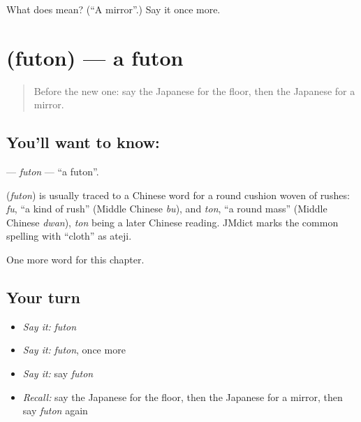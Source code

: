 \begin{tcolorbox}[breakable,colback=teal!4,colframe=teal!35!black,title={Before you move on}]
What does  mean? (\textquotedblleft{}A mirror\textquotedblright{}.) Say it once more.
\end{tcolorbox}
\section[\texorpdfstring{\ja{ふとん} (futon)}{ふとん (futon)}]{ (futon) — a futon}

\label{lesson:JA-C38-futon}



\begin{quote}
Before the new one: say the Japanese for the floor, then the Japanese for a mirror.
\end{quote}

\subsection*{You'll want to know: }
\textbf{} — \emph{futon} — \textquotedblleft{}a futon\textquotedblright{}.

\begin{cousinweb}
\textbf{} (\emph{futon}) is usually traced to a Chinese word for a round cushion woven of rushes: \emph{fu}, \textquotedblleft{}a kind of rush\textquotedblright{} (Middle Chinese \emph{bu}), and \emph{ton}, \textquotedblleft{}a round mass\textquotedblright{} (Middle Chinese \emph{dwan}), \emph{ton} being a later Chinese reading. JMdict marks the common spelling with \textquotedblleft{}cloth\textquotedblright{} as ateji.
\end{cousinweb}

\begin{grammarlens}[title={What you've built}]
One more word for this chapter.
\end{grammarlens}

\subsection*{Your turn}
\begin{itemize}
\raggedright
  \item \emph{Say it:} \emph{futon}
  \item \emph{Say it:} \emph{futon}, once more
  \item \emph{Say it:} say \emph{futon}
  \item \emph{Recall:} say the Japanese for the floor, then the Japanese for a mirror, then say \emph{futon} again
\end{itemize}

